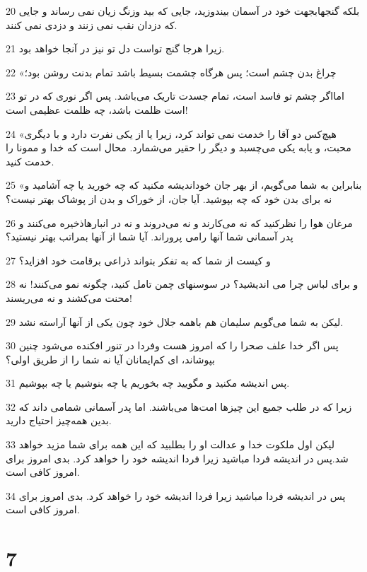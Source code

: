 \par 20 بلکه گنجهابجهت خود در آسمان بیندوزید، جایی که بید وزنگ زیان نمی رساند و جایی که دزدان نقب نمی زنند و دزدی نمی کنند.
\par 21 زیرا هرجا گنج تواست دل تو نیز در آنجا خواهد بود.
\par 22 «چراغ بدن چشم است؛ پس هرگاه چشمت بسیط باشد تمام بدنت روشن بود؛
\par 23 امااگر چشم تو فاسد است، تمام جسدت تاریک می‌باشد. پس اگر نوری که در تو است ظلمت باشد، چه ظلمت عظیمی است!
\par 24 «هیچ‌کس دو آقا را خدمت نمی تواند کرد، زیرا یا از یکی نفرت دارد و با دیگری محبت، و یابه یکی می‌چسبد و دیگر را حقیر می‌شمارد. محال است که خدا و ممونا را خدمت کنید.
\par 25 «بنابراین به شما می‌گویم، از بهر جان خوداندیشه مکنید که چه خورید یا چه آشامید و نه برای بدن خود که چه بپوشید. آیا جان، از خوراک و بدن از پوشاک بهتر نیست؟
\par 26 مرغان هوا را نظرکنید که نه می‌کارند و نه می‌دروند و نه در انبارهاذخیره می‌کنند و پدر آسمانی شما آنها رامی پروراند. آیا شما از آنها بمراتب بهتر نیستید؟
\par 27 و کیست از شما که به تفکر بتواند ذراعی برقامت خود افزاید؟
\par 28 و برای لباس چرا می اندیشید؟ در سوسنهای چمن تامل کنید، چگونه نمو می‌کنند! نه محنت می‌کشند و نه می‌ریسند!
\par 29 لیکن به شما می‌گویم سلیمان هم باهمه جلال خود چون یکی از آنها آراسته نشد.
\par 30 پس اگر خدا علف صحرا را که امروز هست وفردا در تنور افکنده می‌شود چنین بپوشاند، ای کم‌ایمانان آیا نه شما را از طریق اولی؟
\par 31 پس اندیشه مکنید و مگویید چه بخوریم یا چه بنوشیم یا چه بپوشیم.
\par 32 زیرا که در طلب جمیع این چیزها امت‌ها می‌باشند. اما پدر آسمانی شمامی داند که بدین همه‌چیز احتیاج دارید.
\par 33 لیکن اول ملکوت خدا و عدالت او را بطلبید که این همه برای شما مزید خواهد شد.پس در اندیشه فردا مباشید زیرا فردا اندیشه خود را خواهد کرد. بدی امروز برای امروز کافی است.
\par 34 پس در اندیشه فردا مباشید زیرا فردا اندیشه خود را خواهد کرد. بدی امروز برای امروز کافی است.

\chapter{7}

